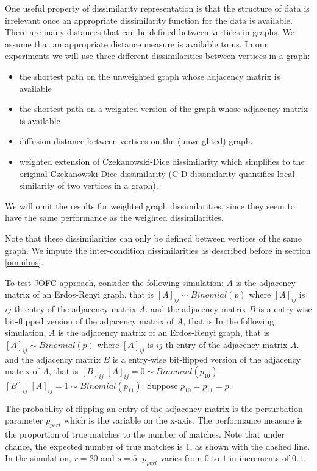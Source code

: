 \documentclass[11pt]{article} %
\begin{document}
One useful property of dissimilarity representation is that the structure of data is irrelevant once an appropriate dissimilarity function  for the data is available. 
There are many distances that can be defined between vertices in graphs. We assume that an appropriate distance measure is available to us.
In our experiments we will use three different dissimilarities between vertices in a graph:
\begin{itemize}
 \item the shortest path on the  unweighted graph whose adjacency matrix is available
 \item the shortest path on a weighted version of the graph whose adjacency matrix is available
 \item diffusion distance between vertices on the (unweighted) graph.
 \item weighted extension of Czekanowski-Dice dissimilarity\cite{DICE,weightedDICE} which simplifies to the original Czekanowski-Dice dissimilarity (C-D dissimilarity  quantifies local similarity of two vertices in a graph).
 \end{itemize}
 We will omit the results for weighted graph dissimilarities, since they seem to have the same performance as the weighted dissimilarities.
 
 Note that these dissimilarities can only be defined between vertices of the same graph. We impute the inter-condition dissimilarities   as described before in section \ref{omnibus}.
 
  To test JOFC approach, consider the following simulation: $A$ is the adjacency matrix of an Erdos-Renyi graph, that is
  $\left[A\right]_{ij} \sim Binomial(p)$ where $\left[A\right]_{ij}$ is $ij$-th entry of the adjacency matrix  $A$.
   and the adjacency matrix  $B$ is a entry-wise bit-flipped version of the adjacency matrix of $A$, that is
   In the following simulation, $A$ is the adjacency matrix of an Erdos-Renyi graph, that is
  $\left[A\right]_{ij} \sim Binomial(p)$ where $\left[A\right]_{ij}$ is $ij$-th entry of the adjacency matrix  $A$.
   and the adjacency matrix  $B$ is a entry-wise bit-flipped version of the adjacency matrix of $A$, that is
   $\left[B\right]_{ij}|\left[A\right]_{ij}=0 \sim Binomial(p_{10})$ $\left[B\right]_{ij}|\left[A\right]_{ij}=1 \sim Binomial(p_{11})$. Suppose $p_{10}=p_{11}=p$.
  
  The probability of flipping an entry of the adjacency matrix is the perturbation parameter $p_{pert}$ which is the variable on the x-axis. 
  The performance measure is the proportion of true matches to the number of matches. Note that 
  under chance, the expected number of true matches is 1, as shown with the dashed line. In the simulation, $r=20$ and $s=5$. $p_{pert}$ varies from $0$ to $1$ in increments of $0.1$. 
	
\end{document}
